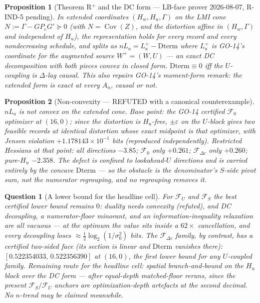 \documentclass[11pt]{article}
\newtheorem{proposition}{Proposition}
\newtheorem{question}{Question}
\begin{document}
\begin{proposition}[Theorem R$^+$ and the DC form --- LB-face
prover 2026-08-07, R-IND-5 pending]
In extended coordinates $(H_w,H_u,\Gamma)$ on the LMI cone
$N:=\Gamma-GP_eG'\succeq0$ (with $N=\operatorname{Cov}(Z)$, and the
distortion affine in $(H_w,\Gamma)$ and \emph{independent of
$H_u$}), the representation holds for every record and every
nondecreasing schedule, and splits as $nL_a=L_a^{+}-\mathrm{Dterm}$
where $L_a^{+}$ is GO-14's coordinate for the \emph{augmented}
source $W^{+}=(W,U)$ --- an exact DC decomposition with \emph{both}
pieces convex in closed form. $\mathrm{Dterm}\equiv0$ iff the
$U$-coupling is $\Delta$-lag causal. This also repairs GO-14's
moment-form remark: the \emph{extended} form is exact at every
$A_u$, causal or not.
\end{proposition}

\begin{proposition}[Non-convexity --- REFUTED with a canonical
counterexample]
$nL_a$ is \emph{not} convex on the extended cone. Base point: the
GO-14 certified $\mathcal F_0$ optimizer at $(16,0)$; since the
distortion is $H_u$-free, $\pm\varepsilon$ on the $U$-block gives
two feasible records at identical distortion whose exact midpoint
is that optimizer, with Jensen violation
$+1.178143\times10^{-1}$ bits (reproduced independently). Restricted
Hessians at that point: all directions $-3.85$; $\mathcal F_0$ only
$+0.261$; $\mathcal F_{\Delta c}$ only $+0.260$; pure-$H_u$
$-2.358$. The defect is confined to lookahead-$U$ directions and is
carried entirely by the concave $\mathrm{Dterm}$ --- so the
obstacle is the \emph{denominator's} $S$-side pivot sum, not the
numerator regrouping, and no regrouping removes it.
\end{proposition}

\begin{question}[A lower bound for the headline cell]
For $\mathcal F_U$ and $\mathcal F_S$ the best certified lower
bound remains $0$: duality needs convexity (refuted), and DC
decoupling, a numerator-floor minorant, and an
information-inequality relaxation are all vacuous --- at the
optimum the value sits inside a $62\times$ cancellation, and every
decoupling loses ${\approx}\tfrac12\log_2(1/\sigma_0^2)$ bits. The
$\mathcal F_{\Delta c}$ family, by contrast, has a certified
two-sided face (its section is linear and $\mathrm{Dterm}$ vanishes
there): $[0.522354033,\,0.522356390]$ at $(16,0)$, the first lower
bound for any $U$-coupled family. Remaining route for the headline
cell: spatial branch-and-bound on the $H_u$ block over the DC form
--- after equal-depth matched-floor reruns, since the present
$\mathcal F_S/\mathcal F_U$ anchors are optimization-depth artefacts
at the second decimal. No $n$-trend may be claimed meanwhile.
\end{question}
\end{document}
